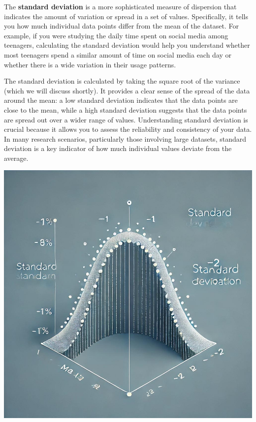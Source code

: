 \documentclass[
]{book}
\begin{document}
The \textbf{standard deviation} is a more sophisticated measure of dispersion that indicates the amount of variation or spread in a set of values. Specifically, it tells you how much individual data points differ from the mean of the dataset. For example, if you were studying the daily time spent on social media among teenagers, calculating the standard deviation would help you understand whether most teenagers spend a similar amount of time on social media each day or whether there is a wide variation in their usage patterns.

The standard deviation is calculated by taking the square root of the variance (which we will discuss shortly). It provides a clear sense of the spread of the data around the mean: a low standard deviation indicates that the data points are close to the mean, while a high standard deviation suggests that the data points are spread out over a wider range of values. Understanding standard deviation is crucial because it allows you to assess the reliability and consistency of your data. In many research scenarios, particularly those involving large datasets, standard deviation is a key indicator of how much individual values deviate from the average.

\includegraphics[width=1\textwidth,height=\textheight]{images/fig050.jpg}
\end{document}
